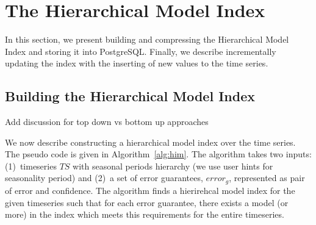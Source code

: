 \documentclass{sigmod}
\newcommand{\LN}{hierarchical model index}
\newcommand{\LNs}{hierarchical model index }
\begin{document}
\section{The Hierarchical Model Index}
\label{sec:building}
In this section, we present building and compressing the  Hierarchical Model Index and storing it into PostgreSQL. Finally, we describe incrementally updating the index with the inserting of new values to the time series.%
 
 
 \subsection{Building the Hierarchical Model Index}
 Add discussion for top down vs bottom up approaches
 
We now describe constructing a \LNs over the time series. The pseudo code is given in Algorithm~\ref{alg:him}. The algorithm takes two inputs: (1)~timeseries $TS$ with seasonal periods hierarchy (we use user hints for seasonality period) and (2)~a set of error guarantees, $error_g$, represented as pair of error and confidence. 
The algorithm finds a hierirehcal model index for the given timeseries such that for each error guarantee, there exists a model (or more) in the index which meets this requirements for the entire timeseries.
\end{document}
